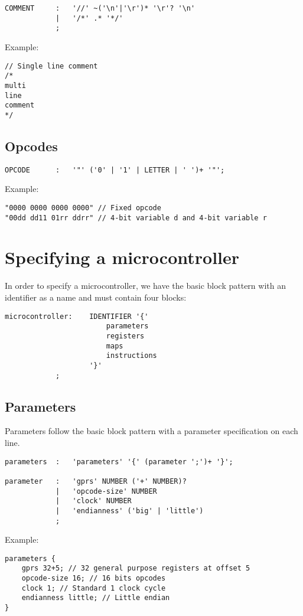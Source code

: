 \begin{lstlisting}
COMMENT		:	'//' ~('\n'|'\r')* '\r'? '\n'
			|	'/*' .* '*/'
			;
\end{lstlisting}

Example:
\begin{lstlisting}
// Single line comment
/*
multi
line
comment
*/
\end{lstlisting}

\subsection{Opcodes}
\begin{lstlisting}
OPCODE		:	'"' ('0' | '1' | LETTER | ' ')+ '"';
\end{lstlisting}

Example:
\begin{lstlisting}
"0000 0000 0000 0000" // Fixed opcode
"00dd dd11 01rr ddrr" // 4-bit variable d and 4-bit variable r
\end{lstlisting}

\section{Specifying a microcontroller}
In order to specify a microcontroller, we have the basic block pattern with an
identifier as a name and must contain four blocks:
\begin{lstlisting}
microcontroller:	IDENTIFIER '{'
						parameters
						registers
						maps
						instructions
					'}'
			;
\end{lstlisting}

\subsection{Parameters}
Parameters follow the basic block pattern with a parameter specification on
each line.

\begin{lstlisting}
parameters	:	'parameters' '{' (parameter ';')+ '}';

parameter	:	'gprs' NUMBER ('+' NUMBER)?
			|	'opcode-size' NUMBER
			|	'clock' NUMBER
			|	'endianness' ('big' | 'little')
			;
\end{lstlisting}

Example:
\begin{lstlisting}
parameters {
	gprs 32+5; // 32 general purpose registers at offset 5
	opcode-size 16; // 16 bits opcodes
	clock 1; // Standard 1 clock cycle
	endianness little; // Little endian
}
\end{lstlisting}


